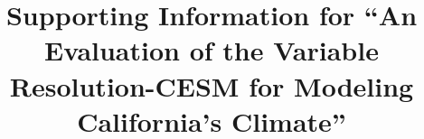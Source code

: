 \documentclass[draft,ms]{agutexSI}
\begin{document}
%
%



\title{Supporting Information for ``An Evaluation of the Variable Resolution-CESM for Modeling California's Climate''}

%
%

%
\end{document}
